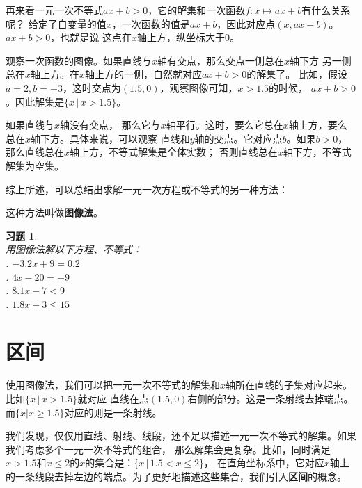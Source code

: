 \documentclass[12pt,UTF8]{ctexbook}
\newtheorem{xt}{习题}[section]
\begin{document}
再来看一元一次不等式$ax + b > 0$，它的解集和一次函数$f:x\mapsto ax + b$有什么关系呢？
给定了自变量的值$x$，一次函数的值是$ax + b$，因此对应点$(x, ax + b)$。$ax + b > 0$，也就是说
这点在$x$轴上方，纵坐标大于$0$。

观察一次函数的图像。如果直线与$x$轴有交点，那么交点一侧总在$x$轴下方
另一侧总在$x$轴上方。在$x$轴上方的一侧，自然就对应$ax + b > 0$的解集了。
比如，假设$a = 2, b = -3$，这时交点为$(1.5, 0)$，观察图像可知，$x > 1.5$的时候，
$ax + b > 0$。因此解集是$\{x \, | \, x > 1.5\}$。

如果直线与$x$轴没有交点，
那么它与$x$轴平行。这时，要么它总在$x$轴上方，要么总在$x$轴下方。具体来说，可以观察
直线和$y$轴的交点。它对应点$b$。如果$b>0$，那么直线总在$x$轴上方，不等式解集是全体实数；
否则直线总在$x$轴下方，不等式解集为空集。

综上所述，可以总结出求解一元一次方程或不等式的另一种方法：
\begin{center}
\end{center}

这种方法叫做\textbf{图像法}。

\begin{xt}\label{xt:5-3-0}
    \mbox{}\\
    用图像法解以下方程、不等式：\\
    . $-3.2x + 9 = 0.2$\\
    . $4x - 20 = -9$\\
    . $8.1x -7 < 9$\\
    . $1.8x + 3 \leqslant 15$
\end{xt}

\section{区间}
使用图像法，我们可以把一元一次不等式的解集和$x$轴所在直线的子集对应起来。比如$\{x \, | \, x > 1.5\}$就对应
直线在点$(1.5, 0)$右侧的部分。这是一条射线去掉端点。而$\{x | x \geqslant 1.5\}$对应的则是一条射线。

我们发现，仅仅用直线、射线、线段，还不足以描述一元一次不等式的解集。如果我们考虑多个一元一次不等式的组合，
那么解集会更复杂。比如，同时满足$x > 1.5$和$x \leqslant 2$的$x$的集合是：$\{x \, | \, 1.5 < x \leqslant 2\}$，
在直角坐标系中，它对应$x$轴上的一条线段去掉左边的端点。为了更好地描述这些集合，我们引入\textbf{区间}的概念。
\end{document}
